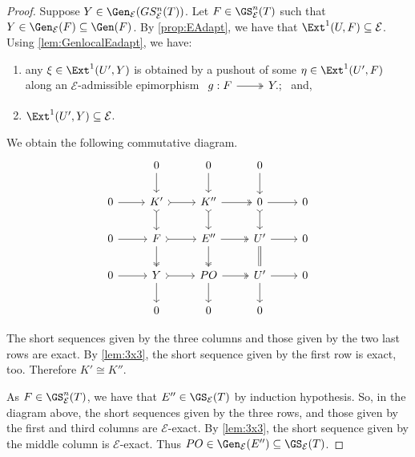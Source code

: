 \begin{proof}
Suppose $Y \in \Gen_\mathcal{E}(GS^{n}_{\mathcal{E}}(T))$. Let $F \in \GS^{n}_{\mathcal{E}}(T)$ such that $Y \in \Gen_{\mathcal{E}}(F) \subseteq \Gen(F)$. By \cref{prop:EAdapt}, we have that $\Ext^1(U,F) \subseteq \mathcal{E}$. Using \cref{lem:GenlocalEadapt}, we have:
\begin{enumerate}[label=$\bullet$, itemsep=1mm]
    \item any $\xi \in \Ext^1(U',Y)$ is obtained by a pushout of some $\eta \in \Ext^1(U',F)$ along an $\mathcal{E}$-admissible epimorphism $\begin{tikzcd}
	 g: F & Y.;
	\arrow[two heads,from=1-1, to=1-2]
   \end{tikzcd}$ and,
   \item $\Ext^1(U',Y) \subseteq \mathcal{E}$.
\end{enumerate}
We obtain the following commutative diagram.
\[\begin{tikzcd}
         & 0 & 0 & 0 &  \\
	0 & K' & K''  & 0 &  0 \\
     0 & F & E'' & U' & 0 \\
      0 & Y & PO & U' & 0 \\
       & 0 & 0 & 0 & 
	\arrow[from=2-1, to=2-2]
	\arrow[tail, from=2-2, to=2-3]
	\arrow[two heads,from=2-3, to=2-4]
	\arrow[from=2-4, to=2-5]
        \arrow[from=3-1, to=3-2]
	\arrow[tail, from=3-2, to=3-3]
	\arrow[two heads,from=3-3, to=3-4]
	\arrow[from=3-4, to=3-5]
        \arrow[from=4-1, to=4-2]
	\arrow[tail, from=4-2, to=4-3]
	\arrow[two heads,from=4-3, to=4-4]
	\arrow[from=4-4, to=4-5]
        \arrow[from=4-2, to=5-2]
	\arrow[two heads, from=3-2, to=4-2]
	\arrow[tail,from=2-2, to=3-2]
	\arrow[from=1-2, to=2-2]
        \arrow[from=4-3, to=5-3]
	\arrow[two heads, from=3-3, to=4-3]
	\arrow[tail,from=2-3, to=3-3]
	\arrow[from=1-3, to=2-3]
        \arrow[from=4-4, to=5-4]
	\arrow[equals, from=3-4, to=4-4]
	\arrow[tail,from=2-4, to=3-4]
	\arrow[from=1-4, to=2-4]
\end{tikzcd} \]

The short sequences given by the three columns and those given by the two last rows are exact. By \cref{lem:3x3}, the short sequence given by the first row is exact, too. Therefore $K' \cong K''$.

As $F \in \GS^{n}_{\mathcal{E}}(T)$, we have that $E'' \in \GS_{\mathcal{E}}(T)$ by induction hypothesis. So, in the diagram above, the short sequences given by the three rows, and those given by the first and third columns are $\mathcal{E}$-exact. By \cref{lem:3x3}, the short sequence given by the middle column is $\mathcal{E}$-exact. Thus $PO \in \Gen_\mathcal{E}(E'') \subseteq \GS_{\mathcal{E}}(T)$.


\end{proof}

